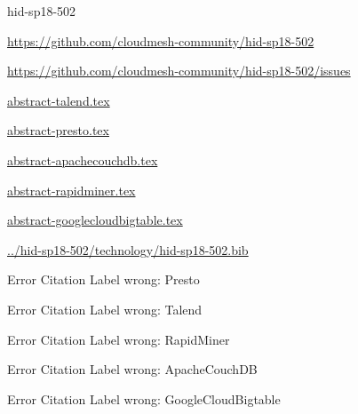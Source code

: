 \begin{IU}

hid-sp18-502

\url{https://github.com/cloudmesh-community/hid-sp18-502}

\url{https://github.com/cloudmesh-community/hid-sp18-502/issues}

\href{https://github.com/cloudmesh-community/hid-sp18-502/blob/master//technology/abstract-talend.tex}{abstract-talend.tex}

\href{https://github.com/cloudmesh-community/hid-sp18-502/blob/master//technology/abstract-presto.tex}{abstract-presto.tex}

\href{https://github.com/cloudmesh-community/hid-sp18-502/blob/master//technology/abstract-apachecouchdb.tex}{abstract-apachecouchdb.tex}

\href{https://github.com/cloudmesh-community/hid-sp18-502/blob/master//technology/abstract-rapidminer.tex}{abstract-rapidminer.tex}

\href{https://github.com/cloudmesh-community/hid-sp18-502/blob/master//technology/abstract-googlecloudbigtable.tex}{abstract-googlecloudbigtable.tex}

\href{https://github.com/cloudmesh-community/hid-sp18-502/blob/master//technology/hid-sp18-502.bib}{../hid-sp18-502/technology/hid-sp18-502.bib}

 Error Citation Label wrong: Presto

 Error Citation Label wrong: Talend

 Error Citation Label wrong: RapidMiner

 Error Citation Label wrong: ApacheCouchDB

 Error Citation Label wrong: GoogleCloudBigtable

\end{IU}


